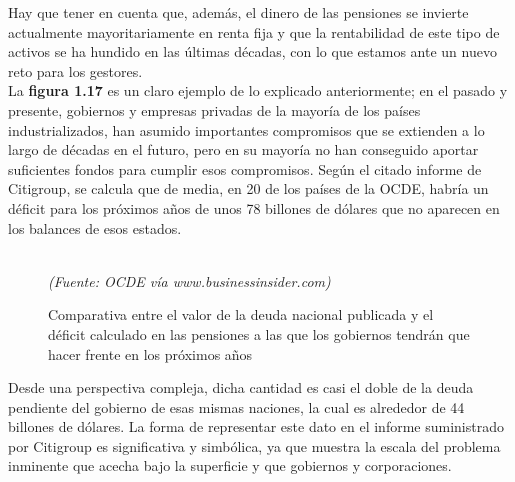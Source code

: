 \noindent \textbf{\checkmark} Hay que tener en cuenta que, adem\'as, el dinero de las pensiones se invierte actualmente mayoritariamente en renta fija y que la rentabilidad de este tipo de activos se ha hundido en las \'ultimas d\'ecadas, con lo que estamos ante un nuevo reto para los gestores.\\

La \textbf{figura 1.17} es un claro ejemplo de lo explicado anteriormente; en el pasado y presente, gobiernos y empresas privadas de la mayor\'ia de los pa\'ises industrializados, han asumido importantes compromisos que se extienden a lo largo de d\'ecadas en el futuro, pero en su mayor\'ia no han conseguido aportar suficientes fondos para cumplir esos compromisos. Seg\'un el citado informe de Citigroup, se calcula que de media, en 20 de los pa\'ises de la OCDE, habr\'ia un d\'eficit para los pr\'oximos a\~nos de unos 78 billones de d\'olares que no aparecen en los balances de esos estados.
\vspace{-0.2cm}
\begin{figure}[H]
\centering
{}
\vspace{-0.25cm}
\caption[Comparativa entre el valor de la deuda nacional publicada y el d\'eficit calculado en las pensiones]{Comparativa entre el valor de la deuda nacional publicada y el d\'eficit calculado en las pensiones a las que los gobiernos tendr\'an que hacer frente en los pr\'oximos a\~nos}\\
\textit{\small{(Fuente: OCDE v\'ia www.businessinsider.com)}}
\end{figure}
Desde una perspectiva compleja, dicha cantidad es casi el doble de la deuda pendiente del gobierno de esas mismas naciones, la cual es alrededor de 44 billones de d\'olares. La forma de representar este dato en el informe suministrado por Citigroup es significativa y simb\'olica, ya que muestra la escala del problema inminente que acecha bajo la superficie y que gobiernos y corporaciones.\\


